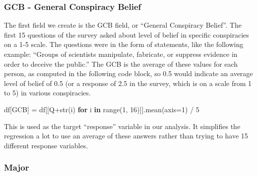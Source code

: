 \documentclass[11pt]{article}
\newenvironment{Shaded}{}{}
\newcommand{\KeywordTok}[1]{\textcolor[rgb]{0.00,0.44,0.13}{\textbf{{#1}}}}
\newcommand{\DecValTok}[1]{\textcolor[rgb]{0.25,0.63,0.44}{{#1}}}
\newcommand{\StringTok}[1]{\textcolor[rgb]{0.25,0.44,0.63}{{#1}}}
\newcommand{\NormalTok}[1]{{#1}}
\newcommand{\ControlFlowTok}[1]{\textcolor[rgb]{0.00,0.44,0.13}{\textbf{{#1}}}}
\newcommand{\OperatorTok}[1]{\textcolor[rgb]{0.40,0.40,0.40}{{#1}}}
\newcommand{\BuiltInTok}[1]{{#1}}
\begin{document}
\subsubsection*{GCB - General Conspiracy Belief}
The first field we create is the GCB field, or ``General Conspiracy
Belief''. The first 15 questions of the survey asked about level of
belief in specific conspiracies on a 1-5 scale. The questions were in
the form of statements, like the following example: ``Groups of
scientists manipulate, fabricate, or suppress evidence in order to
deceive the public.'' The GCB is the average of these values for each
person, as computed in the following code block, so 0.5 would indicate an average level of belief of 0.5 (or a response of 2.5 in the survey, which is on a scale from 1 to 5) in
various conspiracies.

\begin{Shaded}
\begin{Highlighting}[]
\NormalTok{df[}\StringTok{\textquotesingle{}GCB\textquotesingle{}}\NormalTok{] }\OperatorTok{=}\NormalTok{ df[[}\StringTok{\textquotesingle{}Q\textquotesingle{}}\OperatorTok{+}\BuiltInTok{str}\NormalTok{(i) }\ControlFlowTok{for}\NormalTok{ i }\KeywordTok{in} \BuiltInTok{range}\NormalTok{(}\DecValTok{1}\NormalTok{, }\DecValTok{16}\NormalTok{)]].mean(axis}\OperatorTok{=}\DecValTok{1}\NormalTok{) }\OperatorTok{/} \DecValTok{5}
\end{Highlighting}
\end{Shaded}

This is used as the target ``response'' variable in our analysis. It
simplifies the regression a lot to use an average of these answers
rather than trying to have 15 different response variables.

\hypertarget{major}{%
\subsubsection*{Major}\label{major}}
\end{document}

